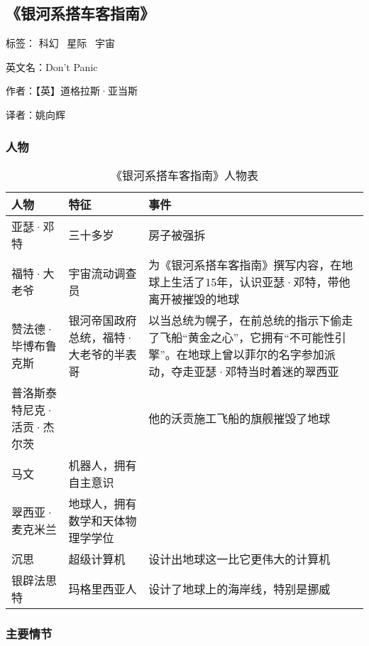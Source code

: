 \subsection{《银河系搭车客指南》}

标签： 科幻 \  星际 \  宇宙

英文名：Don't Panic

作者：【英】道格拉斯·亚当斯

译者：姚向辉

\subsubsection{人物}

\begin{longtable}{p{}|p{}|p{}}
\caption{《银河系搭车客指南》人物表}\\
\hline


人物 & 特征 & 事件 \\
\hline
\endhead

亚瑟·邓特 & 三十多岁 & 房子被强拆 \\
福特·大老爷 & 宇宙流动调查员 & 为《银河系搭车客指南》撰写内容，在地球上生活了15年，认识亚瑟·邓特，带他离开被摧毁的地球 \\
赞法德·毕博布鲁克斯 & 银河帝国政府总统，福特·大老爷的半表哥 & 以当总统为幌子，在前总统的指示下偷走了飞船“黄金之心”，它拥有“不可能性引擎”。在地球上曾以菲尔的名字参加派动，夺走亚瑟·邓特当时着迷的翠西亚 \\
普洛斯泰特尼克·活贡·杰尔茨 &  & 他的沃贡施工飞船的旗舰摧毁了地球 \\
马文 & 机器人，拥有自主意识 & \\
翠西亚·麦克米兰 & 地球人，拥有数学和天体物理学学位 & \\
沉思 & 超级计算机 & 设计出地球这一比它更伟大的计算机 \\
银辟法思特 & 玛格里西亚人 & 设计了地球上的海岸线，特别是挪威 \\
\hline
\end{longtable}

\subsubsection{主要情节}

